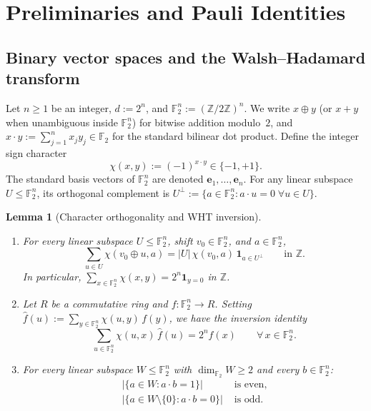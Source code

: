 \documentclass[11pt,a4paper]{article}
\theoremstyle{plain}
\newtheorem{lemma}{Lemma}[section]
\theoremstyle{definition}
\theoremstyle{remark}
\newcommand{\Z}{\mathbb{Z}}
\newcommand{\F}{\mathbb{F}}
\newcommand{\abs}[1]{\lvert#1\rvert}
\newcommand{\indic}[1]{\mathbf{1}_{#1}}
\numberwithin{equation}{section}
\begin{document}
\section{Preliminaries and Pauli Identities}\label{sec:prelim}

\subsection{Binary vector spaces and the Walsh--Hadamard transform}

Let $n \ge 1$ be an integer, $d := 2^n$, and $\F_2^n := (\Z/2\Z)^n$. We write $x \oplus y$ (or $x + y$ when unambiguous inside $\F_2^n$) for bitwise addition modulo~$2$, and $x \cdot y := \sum_{j=1}^n x_j y_j \in \F_2$ for the standard bilinear dot product. Define the integer sign character
\[
  \chi(x, y) := (-1)^{x \cdot y} \in \{-1, +1\}.
\]
The standard basis vectors of $\F_2^n$ are denoted $\mathbf{e}_1, \dots, \mathbf{e}_n$. For any linear subspace $U \le \F_2^n$, its orthogonal complement is $U^\perp := \{a \in \F_2^n : a \cdot u = 0 \;\forall u \in U\}$.

\begin{lemma}[Character orthogonality and WHT inversion]\label{lem:wht}
\leavevmode
\begin{enumerate}[label=(\roman*),leftmargin=2em]
  \item For every linear subspace $U \le \F_2^n$, shift $v_0 \in \F_2^n$, and $a \in \F_2^n$,
  \[
    \sum_{u \in U} \chi(v_0 \oplus u, a) = \abs{U}\,\chi(v_0, a)\,\indic{a \in U^\perp} \qquad \text{in } \Z.
  \]
  In particular, $\sum_{x \in \F_2^n} \chi(x, y) = 2^n \indic{y = 0}$ in $\Z$.
  \item Let $R$ be a commutative ring and $f : \F_2^n \to R$. Setting $\widehat{f}(u) := \sum_{y \in \F_2^n} \chi(u, y)\, f(y)$, we have the inversion identity
  \[
    \sum_{u \in \F_2^n} \chi(u, x)\,\widehat{f}(u) = 2^n f(x) \qquad \forall\, x \in \F_2^n.
  \]
  \item For every linear subspace $W \le \F_2^n$ with $\dim_{\F_2} W \ge 2$ and every $b \in \F_2^n$:
  \begin{align*}
    \abs{\{a \in W : a \cdot b = 1\}} &\text{ is even,} \\
    \abs{\{a \in W \setminus \{0\} : a \cdot b = 0\}} &\text{ is odd.}
  \end{align*}
\end{enumerate}
\end{lemma}
\end{document}
